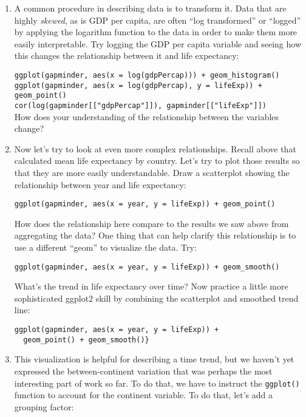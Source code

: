 \documentclass[a4paper,12pt]{article}
\begin{document}
\begin{enumerate}
\item A common procedure in describing data is to transform it. Data that are highly \textit{skewed}, as is GDP per capita, are often ``log transformed'' or ``logged'' by applying the logarithm function to the data in order to make them more easily interpretable. Try logging the GDP per capita variable and seeing how this changes the relationship between it and life expectancy:

\texttt{ggplot(gapminder, aes(x = log(gdpPercap))) + geom\_histogram()}\\
\texttt{ggplot(gapminder, aes(x = log(gdpPercap), y = lifeExp)) + geom\_point()}\\
\texttt{cor(log(gapminder[["gdpPercap"]]), gapminder[["lifeExp"]])}\\

How does your understanding of the relationship between the variables change?

\item Now let's try to look at even more complex relationships. Recall above that calculated mean life expectancy by country. Let's try to plot those results so that they are more easily understandable. Draw a scatterplot showing the relationship between year and life expectancy:

\texttt{ggplot(gapminder, aes(x = year, y = lifeExp)) + geom\_point()}

How does the relationship here compare to the results we saw above from aggregating the data? One thing that can help clarify this relationship is to use a different ``geom'' to visualize the data. Try:

\texttt{ggplot(gapminder, aes(x = year, y = lifeExp)) + geom\_smooth()}

What's the trend in life expectancy over time? Now practice a little more sophisticated ggplot2 skill by combining the scatterplot and smoothed trend line:

\begin{verbatim}
ggplot(gapminder, aes(x = year, y = lifeExp)) + 
  geom_point() + geom_smooth()}
\end{verbatim}

\item This visualization is helpful for describing a time trend, but we haven't yet expressed the between-continent variation that was perhaps the most interesting part of work so far. To do that, we have to instruct the \texttt{ggplot()} function to account for the continent variable. To do that, let's add a grouping factor:


\end{enumerate}
\end{document}
